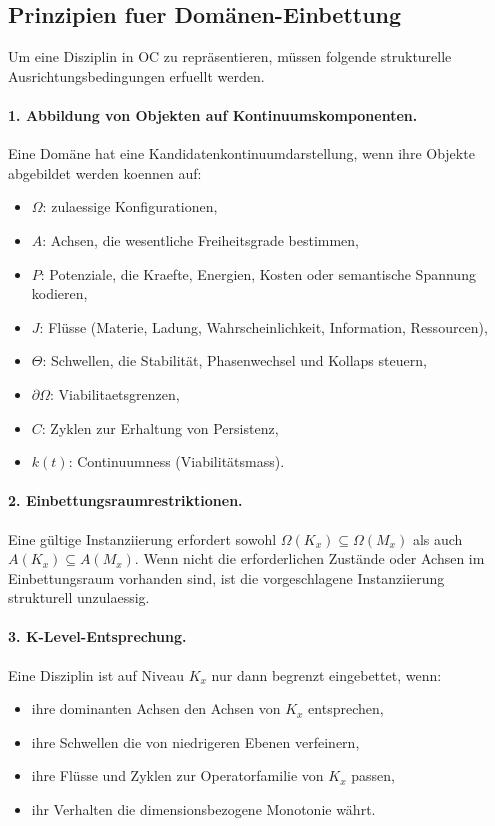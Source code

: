 \subsection{Prinzipien fuer Domänen-Einbettung}

Um eine Disziplin in OC zu repräsentieren, müssen folgende strukturelle
Ausrichtungsbedingungen erfuellt werden.

\paragraph{1. Abbildung von Objekten auf Kontinuumskomponenten.}
Eine Domäne hat eine Kandidatenkontinuumdarstellung, wenn ihre Objekte abgebildet
werden koennen auf:
\begin{itemize}
  \item \(\Omega\): zulaessige Konfigurationen,
  \item \(A\): Achsen, die wesentliche Freiheitsgrade bestimmen,
  \item \(P\): Potenziale, die Kraefte, Energien, Kosten oder semantische
        Spannung kodieren,
  \item \(J\): Flüsse (Materie, Ladung, Wahrscheinlichkeit, Information,
        Ressourcen),
  \item \(\Theta\): Schwellen, die Stabilität, Phasenwechsel und Kollaps
        steuern,
  \item \(\partial\Omega\): Viabilitaetsgrenzen,
  \item \(C\): Zyklen zur Erhaltung von Persistenz,
  \item \(k(t)\): Continuumness (Viabilitätsmass).
\end{itemize}

\paragraph{2. Einbettungsraumrestriktionen.}
Eine gültige Instanziierung erfordert sowohl
\(\Omega(K_x)\subseteq\Omega(M_x)\) als auch \(A(K_x)\subseteq A(M_x)\). Wenn
nicht die erforderlichen Zustände oder Achsen im Einbettungsraum vorhanden sind,
ist die vorgeschlagene Instanziierung strukturell unzulaessig.

\paragraph{3. K-Level-Entsprechung.}
Eine Disziplin ist auf Niveau \(K_x\) nur dann begrenzt eingebettet, wenn:
\begin{itemize}
  \item ihre dominanten Achsen den Achsen von \(K_x\) entsprechen,
  \item ihre Schwellen die von niedrigeren Ebenen verfeinern,
  \item ihre Flüsse und Zyklen zur Operatorfamilie von \(K_x\) passen,
  \item ihr Verhalten die dimensionsbezogene Monotonie währt.
\end{itemize}

